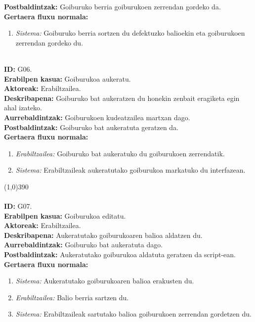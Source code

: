 \textbf{Postbaldintzak:} Goiburuko berria goiburukoen zerrendan gordeko da.\\
\textbf{Gertaera fluxu normala:}
\begin{enumerate}
	\item \textit{Sistema:} Goiburuko berria sortzen du defektuzko balioekin eta goiburukoen zerrendan gordeko du.
\end{enumerate}
\noindent\\
\textbf{ID:} G06.\\
\textbf{Erabilpen kasua:} Goiburukoa aukeratu.\\
\textbf{Aktoreak:} Erabiltzailea.\\
\textbf{Deskribapena:} Goiburuko bat aukeratzen du honekin zenbait eragiketa egin ahal izateko.\\
\textbf{Aurrebaldintzak:} Goiburukoen kudeatzailea martxan dago.\\
\textbf{Postbaldintzak:} Goiburuko bat aukeratuta geratzen da.\\
\textbf{Gertaera fluxu normala:}
\begin{enumerate}
	\item \textit{Erabiltzailea:} Goiburuko bat aukeratuko du goiburukoen zerrendatik.
	\item \textit{Sistema:} Erabiltzaileak aukeratutako goiburukoa markatuko du interfazean.
\end{enumerate}
\line(1,0){390}\\
\noindent\\
\textbf{ID:} G07.\\
\textbf{Erabilpen kasua:} Goiburukoa editatu.\\
\textbf{Aktoreak:} Erabiltzailea.\\
\textbf{Deskribapena:} Aukeratutako goiburukoaren balioa aldatzen du.\\
\textbf{Aurrebaldintzak:} Goiburuko bat aukeratuta dago.\\
\textbf{Postbaldintzak:} Aukeratutako goiburukoa aldatuta geratzen da script-ean.\\
\textbf{Gertaera fluxu normala:}
\begin{enumerate}
	\item \textit{Sistema:} Aukeratutako goiburukoaren balioa erakusten du.
	\item \textit{Erabiltzailea:} Balio berria sartzen du.
	\item \textit{Sistema:} Erabiltzaileak sartutako balioa goiburukoen zerrendan gordetzen du.
\end{enumerate}
